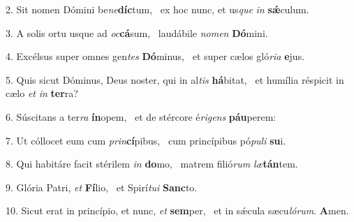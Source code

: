 2. Sit nomen Dómini be\textit{ne}\textbf{díc}tum, \ast\  ex hoc nunc, et us\textit{que} \textit{in} \textbf{sǽ}culum.\

3. A solis ortu usque ad \textit{oc}\textbf{cá}sum, \ast\  laudábile \textit{no}\textit{men} \textbf{Dó}mini.\

4. Excélsus super omnes gen\textit{tes} \textbf{Dó}minus, \ast\  et super cælos gló\textit{ri}\textit{a} \textbf{e}jus.\

5. Quis sicut Dóminus, Deus noster, qui in al\textit{tis} \textbf{há}bitat, \ast\  et humília réspicit in cælo \textit{et} \textit{in} \textbf{ter}ra?\

6. Súscitans a ter\textit{ra} \textbf{ín}opem, \ast\  et de stércore é\textit{ri}\textit{gens} \textbf{páu}perem:\

7. Ut cóllocet eum cum \textit{prin}\textbf{cí}pibus, \ast\  cum princípibus pó\textit{pu}\textit{li} \textbf{su}i.\

8. Qui habitáre facit stérilem \textit{in} \textbf{do}mo, \ast\  matrem filió\textit{rum} \textit{læ}\textbf{tán}tem.\

9. Glória Patri, \textit{et} \textbf{Fí}lio, \ast\  et Spirí\textit{tu}\textit{i} \textbf{Sanc}to.\

10. Sicut erat in princípio, et nunc, \textit{et} \textbf{sem}per, \ast\  et in sǽcula sæcu\textit{ló}\textit{rum}. \textbf{A}men.\


